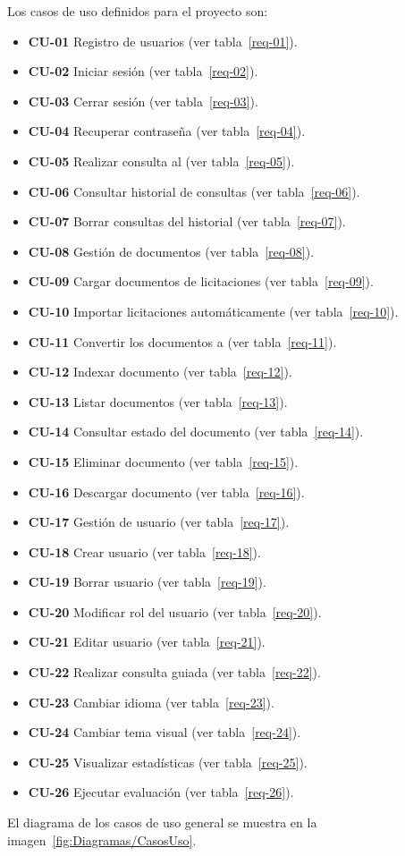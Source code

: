 Los casos de uso definidos para el proyecto son:
\begin{itemize}
\tightlist
	\item \textbf{CU-01} Registro de usuarios (ver tabla~\ref{req-01}).
	\item \textbf{CU-02} Iniciar sesión (ver tabla~\ref{req-02}).
	\item \textbf{CU-03} Cerrar sesión (ver tabla~\ref{req-03}).
	\item \textbf{CU-04} Recuperar contraseña (ver tabla~\ref{req-04}).
	\item \textbf{CU-05} Realizar consulta al  (ver tabla~\ref{req-05}).
	\item \textbf{CU-06} Consultar historial de consultas (ver tabla~\ref{req-06}).
	\item \textbf{CU-07} Borrar consultas del historial (ver tabla~\ref{req-07}).
	\item \textbf{CU-08} Gestión de documentos (ver tabla~\ref{req-08}).
	\item \textbf{CU-09} Cargar documentos de licitaciones (ver tabla~\ref{req-09}).
	\item \textbf{CU-10} Importar licitaciones automáticamente (ver tabla~\ref{req-10}).
	\item \textbf{CU-11} Convertir los documentos a  (ver tabla~\ref{req-11}).
	\item \textbf{CU-12} Indexar documento (ver tabla~\ref{req-12}).
	\item \textbf{CU-13} Listar documentos (ver tabla~\ref{req-13}).
	\item \textbf{CU-14} Consultar estado del documento (ver tabla~\ref{req-14}).
	\item \textbf{CU-15} Eliminar documento (ver tabla~\ref{req-15}).
	\item \textbf{CU-16} Descargar documento (ver tabla~\ref{req-16}).
	\item \textbf{CU-17} Gestión de usuario (ver tabla~\ref{req-17}).
	\item \textbf{CU-18} Crear usuario (ver tabla~\ref{req-18}).
	\item \textbf{CU-19} Borrar usuario (ver tabla~\ref{req-19}).
	\item \textbf{CU-20} Modificar rol del usuario (ver tabla~\ref{req-20}).
	\item \textbf{CU-21} Editar usuario (ver tabla~\ref{req-21}).
	\item \textbf{CU-22} Realizar consulta guiada (ver tabla~\ref{req-22}).
	\item \textbf{CU-23} Cambiar idioma (ver tabla~\ref{req-23}).
	\item \textbf{CU-24} Cambiar tema visual (ver tabla~\ref{req-24}).
	\item \textbf{CU-25} Visualizar estadísticas (ver tabla~\ref{req-25}).
	\item \textbf{CU-26} Ejecutar evaluación  (ver tabla~\ref{req-26}).
\end{itemize}
El diagrama de los casos de uso general se muestra en la imagen~\ref{fig:Diagramas/CasosUso}.

